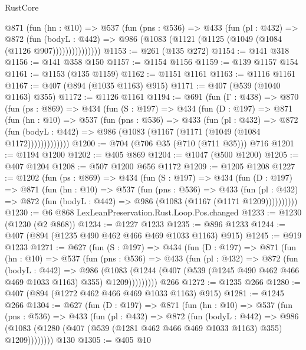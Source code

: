 \begin{lexlean}{RustCore}
\begin{coremodule}
            @871
              (fun (hn : @10) =>
              @537
                (fun (pns : @536) =>
                @433
                  (fun (pl : @432) =>
                  @872
                    (fun (bodyL : @442) =>
                    @986 (@1083 (@1121 (@1125 (@1049 (@1084 (@1126 @907)))))))))))))))
@1153 := @261 (@135 @272)
@1154 := @141 @318
@1156 := @141 @358 @150
@1157 := @1154 @1156
@1159 := @139 @1157 @154
@1161 := @1153 (@135 @1159)
@1162 := @1151 @1161
@1163 := @1116 @1161
@1167 := @407 (@894 (@1035 @1163) @915)
@1171 := @407 (@539 (@1040 @1163) @355)
@1172 := @1126 @1161
@1194 := @691
    (fun (Γ : @438) =>
    @870
      (fun (ps : @869) =>
      @434
        (fun (S : @197) =>
        @434
          (fun (D : @197) =>
          @871
            (fun (hn : @10) =>
            @537
              (fun (pns : @536) =>
              @433
                (fun (pl : @432) =>
                @872
                  (fun (bodyL : @442) => @986 (@1083 (@1167 (@1171 (@1049 (@1084 @1172)))))))))))))
@1200 := @704 (@706 @35 (@710 (@711 @35))) @716
@1201 := @1194 @1200
@1202 := @405 @869
@1204 := @1047 (@500 @1200)
@1205 := @407 @1204
@1208 := @507 @1200 @656 @1172
@1209 := @1205 @1208
@1227 := @1202
    (fun (ps : @869) =>
    @434
      (fun (S : @197) =>
      @434
        (fun (D : @197) =>
        @871
          (fun (hn : @10) =>
          @537
            (fun (pns : @536) =>
            @433
              (fun (pl : @432) =>
              @872 (fun (bodyL : @442) => @986 (@1083 (@1167 (@1171 @1209))))))))))
@1230 := @6 @868 LexLeanPreservation.Rust.Loop.Pos.changed
@1233 := @1230 (@1230 (@2 @868))
@1234 := @1227 @1233
@1235 := @896 @1233
@1244 := @407 (@894 (@1235 @490 @462 @466 @469 @1033 @1163) @915)
@1245 := @919 @1233
@1271 := @627
    (fun (S : @197) =>
    @434
      (fun (D : @197) =>
      @871
        (fun (hn : @10) =>
        @537
          (fun (pns : @536) =>
          @433
            (fun (pl : @432) =>
            @872
              (fun (bodyL : @442) =>
              @986
                (@1083
                  (@1244 (@407 (@539 (@1245 @490 @462 @466 @469 @1033 @1163) @355) @1209)))))))))
    @266
@1272 := @1235 @266
@1280 := @407 (@894 (@1272 @462 @466 @469 @1033 @1163) @915)
@1281 := @1245 @266
@1304 := @627
    (fun (D : @197) =>
    @871
      (fun (hn : @10) =>
      @537
        (fun (pns : @536) =>
        @433
          (fun (pl : @432) =>
          @872
            (fun (bodyL : @442) =>
            @986 (@1083 (@1280 (@407 (@539 (@1281 @462 @466 @469 @1033 @1163) @355) @1209))))))))
    @130
@1305 := @405 @10

\end{coremodule}
\end{lexlean}
